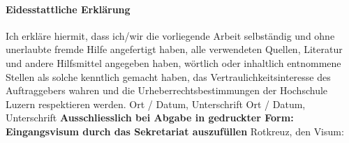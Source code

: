 \documentclass[a4paper, table]{article}
\begin{document}
\paragraph{\textbf{Eidesstattliche Erkl\"arung}}
Ich erkl\"are hiermit, dass ich/wir die vorliegende Arbeit selbst\"andig und ohne unerlaubte fremde Hilfe angefertigt haben, alle verwendeten Quellen, Literatur und andere Hilfsmittel angegeben haben, w\"ortlich oder inhaltlich entnommene Stellen als solche kenntlich gemacht haben, das Vertraulichkeitsinteresse des Auftraggebers wahren und die Urheberrechtsbestimmungen der Hochschule Luzern respektieren werden. \newline \newline
Ort / Datum, Unterschrift	\underline{\hspace*{8cm}} \newline \newline
Ort / Datum, Unterschrift	\underline{\hspace*{8cm}} \newline \newline \newline
\textbf{Ausschliesslich bei Abgabe in gedruckter Form: \\
Eingangsvisum durch das Sekretariat auszuf\"ullen}\newline \newline
Rotkreuz, den	\underline{\hspace*{4cm}}	\hspace*{1cm} Visum:	\underline{\hspace*{4cm}}

\normalfont
\newpage
\end{document}

